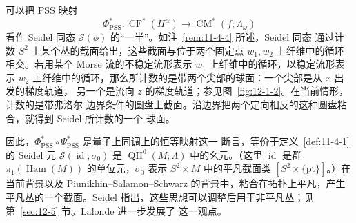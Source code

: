 \begin{remark}\label{rem:12-1-7}
可以把 PSS 映射
\[
  \Phi^*_{\mathrm{PSS}}:\operatorname{CF}^*(H^\alpha)
  \longrightarrow\operatorname{CM}^*(f;\Lambda_\omega)
\]
看作 Seidel 同态 $\mathcal S(\phi)$ 的“一半”。如注~\ref{rem:11-4-4} 所述，Seidel 同态
通过计数 $S^2$ 上某个丛的截面给出，这些截面与位于两个固定点 $w_1,w_2$ 上纤维中的循环
相交。若用某个 Morse 流的不稳定流形表示 $w_1$ 上纤维中的循环，以稳定流形表示 $w_2$
上纤维中的循环，那么所计数的是带两个尖部的球面：一个尖部是从 $x$ 出发的梯度轨道，
另一个是流向 $z$ 的梯度轨道；参见图~\ref{fig:12-1-2}。在当前情形，计数的是带弗洛尔
边界条件的圆盘上截面。沿边界把两个定向相反的这种圆盘粘合，就得到 Seidel 所计数的一个
球面。

因此，$\Phi^*_{\mathrm{PSS}}\circ\Psi^*_{\mathrm{PSS}}$ 是量子上同调上的恒等映射这一
断言，等价于定义~\ref{def:11-4-1} 的 Seidel 元 $\mathcal S(\operatorname{id},\sigma_0)$
是 $\operatorname{QH}^0(M;\Lambda)$ 中的幺元。（这里 $\operatorname{id}$ 是群
$\pi_1(\operatorname{Ham}(M))$ 的单位元，$\sigma_0$ 表示 $S^2\times M$ 中的平凡截面类
$[S^2\times\{\mathrm{pt}\}]$。）在当前背景以及 Piunikhin--Salamon--Schwarz
 的背景中，粘合在拓扑上平凡，产生平凡丛的一个截面。Seidel 
指出，这些思想可以调整后用于非平凡丛；见第~\ref{sec:12-5} 节。Lalonde  进一步发展了
这一观点。
\end{remark}
